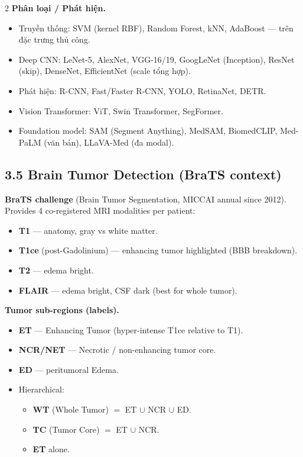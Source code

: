 \begin{paracol}{2}
\textbf{Phân loại / Phát hiện.}
\begin{itemize}[leftmargin=*,nosep]
  \item Truyền thống: SVM (kernel RBF), Random Forest, kNN, AdaBoost — trên đặc trưng thủ công.
  \item Deep CNN: LeNet-5, AlexNet, VGG-16/19, GoogLeNet (Inception), ResNet (skip), DenseNet, EfficientNet (scale tổng hợp).
  \item Phát hiện: R-CNN, Fast/Faster R-CNN, YOLO, RetinaNet, DETR.
  \item Vision Transformer: ViT, Swin Transformer, SegFormer.
  \item Foundation model: SAM (Segment Anything), MedSAM, BiomedCLIP, Med-PaLM (văn bản), LLaVA-Med (đa modal).
\end{itemize}

\switchcolumn*

\subsection*{3.5 Brain Tumor Detection (BraTS context)}
\textbf{BraTS challenge} (Brain Tumor Segmentation, MICCAI annual since 2012). Provides 4 co-registered MRI modalities per patient:
\begin{itemize}[leftmargin=*,nosep]
  \item \textbf{T1} — anatomy, gray vs white matter.
  \item \textbf{T1ce} (post-Gadolinium) — enhancing tumor highlighted (BBB breakdown).
  \item \textbf{T2} — edema bright.
  \item \textbf{FLAIR} — edema bright, CSF dark (best for whole tumor).
\end{itemize}

\textbf{Tumor sub-regions (labels).}
\begin{itemize}[leftmargin=*,nosep]
  \item \textbf{ET} — Enhancing Tumor (hyper-intense T1ce relative to T1).
  \item \textbf{NCR/NET} — Necrotic / non-enhancing tumor core.
  \item \textbf{ED} — peritumoral Edema.
  \item Hierarchical:
    \begin{itemize}[leftmargin=*,nosep]
      \item \textbf{WT} (Whole Tumor) $=$ ET $\cup$ NCR $\cup$ ED.
      \item \textbf{TC} (Tumor Core) $=$ ET $\cup$ NCR.
      \item \textbf{ET} alone.
    \end{itemize}
\end{itemize}


\end{paracol}
